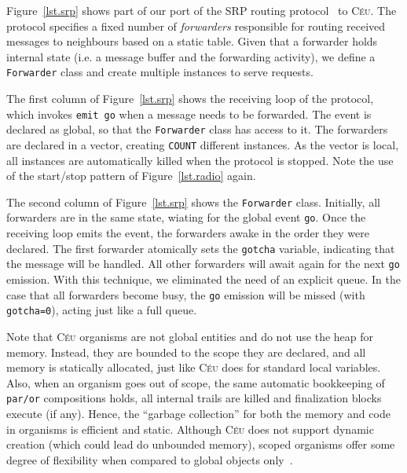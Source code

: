 \documentclass[10pt]{sensys-proc}
\newcommand{\CEU}{\textsc{C\'{e}u}\xspace}
\newcommand{\code}[1] {{\small{\texttt{#1}}}}
\begin{document}
Figure~\ref{lst.srp} shows part of our port of the SRP routing 
protocol~\cite{wsn.teps} to \CEU.
The protocol specifies a fixed number of \emph{forwarders} responsible for 
routing received messages to neighbours based on a static table.
Given that a forwarder holds internal state (i.e. a message buffer and the 
forwarding activity), we define a \code{Forwarder} class and create multiple 
instances to serve requests.

The first column of Figure~\ref{lst.srp} shows the receiving loop of the 
protocol, which invokes \code{emit~go} when a message needs to be forwarded.
The event is declared as global, so that the \code{Forwarder} class has access 
to it.
The forwarders are declared in a vector, creating \code{COUNT} different 
instances.
As the vector is local, all instances are automatically killed when the 
protocol is stopped.
Note the use of the start/stop pattern of Figure~\ref{lst.radio} again.

The second column of Figure~\ref{lst.srp} shows the \code{Forwarder} class.
Initially, all forwarders are in the same state, wiating for the global event 
\code{go}.
Once the receiving loop emits the event, the forwarders awake in the order they 
were declared.
The first forwarder atomically sets the \code{gotcha} variable, indicating that 
the message will be handled.
All other forwarders will await again for the next \code{go} emission.
With this technique, we eliminated the need of an explicit queue.
In the case that all forwarders become busy, the \code{go} emission will be 
missed (with \code{gotcha=0}), acting just like a full queue.

Note that \CEU organisms are not global entities and do not use the heap for 
memory.
Instead, they are bounded to the scope they are declared, and all memory is 
statically allocated, just like \CEU does for standard local variables.
Also, when an organism goes out of scope, the same automatic bookkeeping of 
\code{par/or} compositions holds, all internal trails are killed and 
finalization blocks execute (if any).
Hence, the ``garbage collection'' for both the memory and code in organisms is 
efficient and static.
Although \CEU does not support dynamic creation (which could lead do unbounded 
memory), scoped organisms offer some degree of flexibility when compared to 
global objects only~\cite{wsn.virgil,wsn.flowtalk}.

\end{document}
